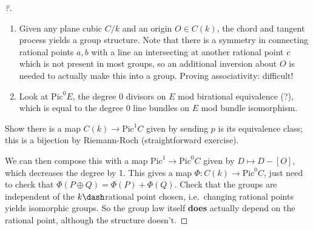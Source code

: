 \begin{proof}[?]

\envlist

\begin{enumerate}
\def\labelenumi{\arabic{enumi}.}
\item
  Given any plane cubic \(C/k\) and an origin \(O \in C(k)\), the chord
  and tangent process yields a group structure. Note that there is a
  symmetry in connecting rational points \(a, b\) with a line an
  intersecting at another rational point \(c\) which is not present in
  most groups, so an additional inversion about \(O\) is needed to
  actually make this into a group. Proving associativity: difficult!
\item
  Look at \(\mathrm{Pic}^0 E\), the degree 0 divisors on \(E\) mod
  birational equivalence (?), which is equal to the degree 0 line
  bundles on \(E\) mod bundle isomorphism.
\end{enumerate}

\begin{exercise}[?]

Show there is a map \(C(k) \to \mathrm{Pic}^1 C\) given by sending \(p\)
is its equivalence class; this is a bijection by Riemann-Roch
(straightforward exercise).

\end{exercise}

We can then compose this with a map
\(\mathrm{Pic}^1 \to \mathrm{Pic}^0 C\) given by \(D \mapsto D - [O]\),
which decreases the degree by 1. This gives a map
\(\Phi: C(k) \to \mathrm{Pic}^0 C\), just need to check that
\(\Phi(P \oplus Q) = \Phi(P) + \Phi(Q)\). Check that the groups are
independent of the \(k\dash\)rational point chosen, i.e.~changing
rational points yields isomorphic groups. So the group law itself
\textbf{does} actually depend on the rational point, although the
structure doesn't.

\end{proof}

